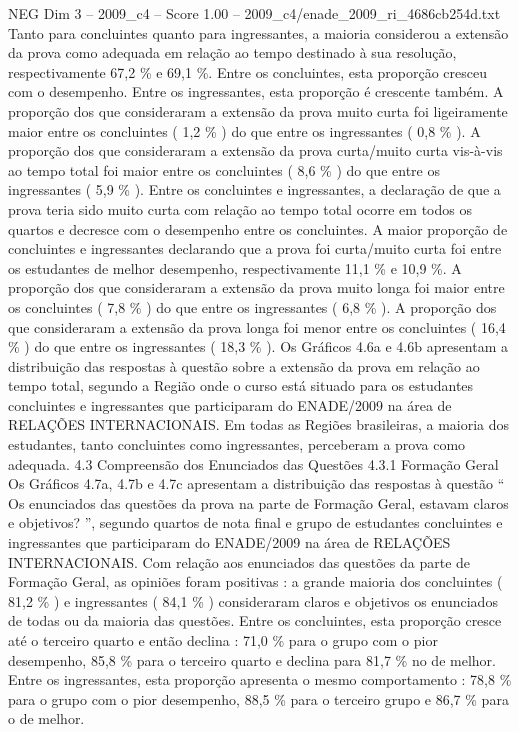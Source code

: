 \begin{textsample}{NEG Dim 3 – 2009\_c4 – Score 1.00 – 2009\_c4/enade\_2009\_ri\_4686cb254d.txt}
Tanto para concluintes quanto para ingressantes, a maioria considerou a extensão da prova como adequada em relação ao tempo destinado à sua resolução, respectivamente 67,2 \% e 69,1 \%.
Entre os concluintes, esta proporção cresceu com o desempenho.
Entre os ingressantes, esta proporção é crescente também.
A proporção dos que consideraram a extensão da prova muito curta foi ligeiramente maior entre os concluintes ( 1,2 \% ) do que entre os ingressantes ( 0,8 \% ).
A proporção dos que consideraram a extensão da prova curta/muito curta vis-à-vis ao tempo total foi maior entre os concluintes ( 8,6 \% ) do que entre os ingressantes ( 5,9 \% ).
Entre os concluintes e ingressantes, a declaração de que a prova teria sido muito curta com relação ao tempo total ocorre em todos os quartos e decresce com o desempenho entre os concluintes.
A maior proporção de concluintes e ingressantes declarando que a prova foi curta/muito curta foi entre os estudantes de melhor desempenho, respectivamente 11,1 \% e 10,9 \%.
A proporção dos que consideraram a extensão da prova muito longa foi maior entre os concluintes ( 7,8 \% ) do que entre os ingressantes ( 6,8 \% ).
A proporção dos que consideraram a extensão da prova longa foi menor entre os concluintes ( 16,4 \% ) do que entre os ingressantes ( 18,3 \% ).
Os Gráficos 4.6a e 4.6b apresentam a distribuição das respostas à questão sobre a extensão da prova em relação ao tempo total, segundo a Região onde o curso está situado para os estudantes concluintes e ingressantes que participaram do ENADE/2009 na área de RELAÇÕES INTERNACIONAIS.
Em todas as Regiões brasileiras, a maioria dos estudantes, tanto concluintes como ingressantes, perceberam a prova como adequada. 4.3 Compreensão dos Enunciados das Questões 4.3.1 Formação Geral Os Gráficos 4.7a, 4.7b e 4.7c apresentam a distribuição das respostas à questão “ Os enunciados das questões da prova na parte de Formação Geral, estavam claros e objetivos? ”, segundo quartos de nota final e grupo de estudantes concluintes e ingressantes que participaram do ENADE/2009 na área de RELAÇÕES INTERNACIONAIS.
Com relação aos enunciados das questões da parte de Formação Geral, as opiniões foram positivas : a grande maioria dos concluintes ( 81,2 \% ) e ingressantes ( 84,1 \% ) consideraram claros e objetivos os enunciados de todas ou da maioria das questões.
Entre os concluintes, esta proporção cresce até o terceiro quarto e então declina : 71,0 \% para o grupo com o pior desempenho, 85,8 \% para o terceiro quarto e declina para 81,7 \% no de melhor.
Entre os ingressantes, esta proporção apresenta o mesmo comportamento : 78,8 \% para o grupo com o pior desempenho, 88,5 \% para o terceiro grupo e 86,7 \% para o de melhor.

\end{textsample}
